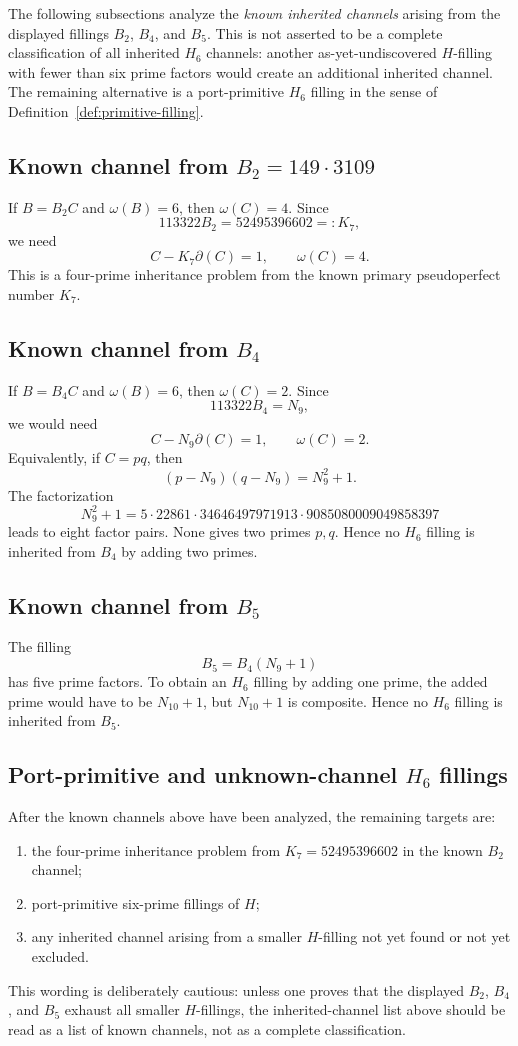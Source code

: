 \documentclass[11pt]{amsart}
\theoremstyle{plain}
\theoremstyle{definition}
\theoremstyle{remark}
\newcommand{\dd}{\partial}
\begin{document}
The following subsections analyze the \emph{known inherited channels} arising from the displayed fillings $B_2$, $B_4$, and $B_5$.  This is not asserted to be a complete classification of all inherited $H_6$ channels: another as-yet-undiscovered $H$-filling with fewer than six prime factors would create an additional inherited channel.  The remaining alternative is a port-primitive $H_6$ filling in the sense of Definition~\ref{def:primitive-filling}.

\subsection{Known channel from \texorpdfstring{$B_2=149\cdot3109$}{B2 = 149*3109}}
If $B=B_2C$ and $\omega(B)=6$, then $\omega(C)=4$.  Since
\[
        113322B_2=52495396602=:K_7,
\]
we need
\[
        C-K_7\dd(C)=1,
        \qquad
        \omega(C)=4.
\]
This is a four-prime inheritance problem from the known primary pseudoperfect number $K_7$.

\subsection{Known channel from \texorpdfstring{$B_4$}{B4}}
If $B=B_4C$ and $\omega(B)=6$, then $\omega(C)=2$.  Since
\[
        113322B_4=N_9,
\]
we would need
\[
        C-N_9\dd(C)=1,
        \qquad
        \omega(C)=2.
\]
Equivalently, if $C=pq$, then
\[
        (p-N_9)(q-N_9)=N_9^2+1.
\]
The factorization
\[
        N_9^2+1
        =5\cdot22861\cdot34646497971913\cdot9085080009049858397
\]
leads to eight factor pairs.  None gives two primes $p,q$.  Hence no $H_6$ filling is inherited from $B_4$ by adding two primes.

\subsection{Known channel from \texorpdfstring{$B_5$}{B5}}
The filling
\[
        B_5=B_4(N_9+1)
\]
has five prime factors.  To obtain an $H_6$ filling by adding one prime, the added prime would have to be $N_{10}+1$, but $N_{10}+1$ is composite.  Hence no $H_6$ filling is inherited from $B_5$.

\subsection{Port-primitive and unknown-channel \texorpdfstring{$H_6$}{H6} fillings}
After the known channels above have been analyzed, the remaining targets are:
\begin{enumerate}[label=(\alph*)]
    \item the four-prime inheritance problem from $K_7=52495396602$ in the known $B_2$ channel;
    \item port-primitive six-prime fillings of $H$;
    \item any inherited channel arising from a smaller $H$-filling not yet found or not yet excluded.
\end{enumerate}
This wording is deliberately cautious: unless one proves that the displayed $B_2$, $B_4$, and $B_5$ exhaust all smaller $H$-fillings, the inherited-channel list above should be read as a list of known channels, not as a complete classification.
\end{document}
